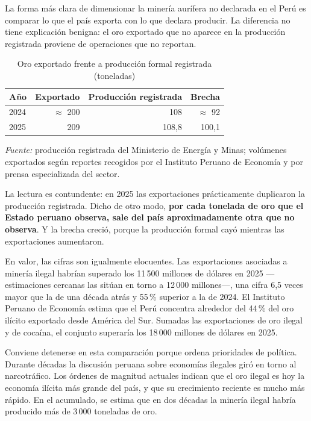 \documentclass[11pt,a4paper]{article}
\begin{document}
La forma más clara de dimensionar la minería aurífera no declarada en el Perú es comparar lo que el país exporta con lo que declara producir. La diferencia no tiene explicación benigna: el oro exportado que no aparece en la producción registrada proviene de operaciones que no reportan.

\begin{table}[h!]
\centering
\singlespacing
\caption{Oro exportado frente a producción formal registrada (toneladas)}
\label{tab:brecha}
\small
\begin{tabular}{l r r r}
\toprule
\textbf{Año} & \textbf{Exportado} & \textbf{Producción registrada} & \textbf{Brecha} \\
\midrule
2024 & $\approx$ 200 & 108 & $\approx$ 92 \\
2025 & 209 & 108{,}8 & 100{,}1 \\
\bottomrule
\end{tabular}

\vspace{0.4em}
\begin{minipage}{0.92\textwidth}
\footnotesize \textit{Fuente:} producción registrada del Ministerio de Energía y Minas; volúmenes exportados según reportes recogidos por el Instituto Peruano de Economía y por prensa especializada del sector.
\end{minipage}
\end{table}

La lectura es contundente: en 2025 las exportaciones prácticamente duplicaron la producción registrada. Dicho de otro modo, \textbf{por cada tonelada de oro que el Estado peruano observa, sale del país aproximadamente otra que no observa}. Y la brecha creció, porque la producción formal cayó mientras las exportaciones aumentaron.

En valor, las cifras son igualmente elocuentes. Las exportaciones asociadas a minería ilegal habrían superado los 11\,500 millones de dólares en 2025 ---estimaciones cercanas las sitúan en torno a 12\,000 millones---, una cifra 6{,}5 veces mayor que la de una década atrás y 55\,\% superior a la de 2024. El Instituto Peruano de Economía estima que el Perú concentra alrededor del 44\,\% del oro ilícito exportado desde América del Sur. Sumadas las exportaciones de oro ilegal y de cocaína, el conjunto superaría los 18\,000 millones de dólares en 2025.

Conviene detenerse en esta comparación porque ordena prioridades de política. Durante décadas la discusión peruana sobre economías ilegales giró en torno al narcotráfico. Los órdenes de magnitud actuales indican que el oro ilegal es hoy la economía ilícita más grande del país, y que su crecimiento reciente es mucho más rápido. En el acumulado, se estima que en dos décadas la minería ilegal habría producido más de 3\,000 toneladas de oro.
\end{document}
